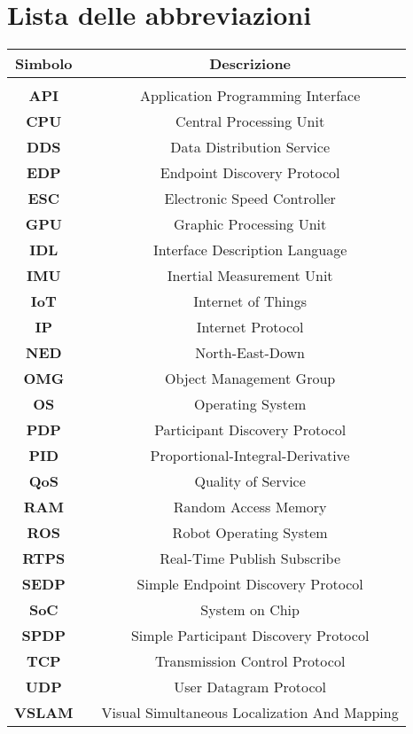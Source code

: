 

\fancyhf{}
\thispagestyle{plain}

\chapter[Lista delle abbreviazioni]{\centering Lista delle abbreviazioni}
\fontsize{14}{14}\selectfont

\begin{center}
\centering
\setlength{\tabcolsep}{15pt}
\fontsize{12}{12}\selectfont
\begin{tabular}{ c c c }
\multicolumn{1}{c}{\Large \textbf{Simbolo}} & & \multicolumn{1}{c}{\Large \textbf{Descrizione}}\\
\hline\hline\\

\textbf{API}   & & Application Programming Interface\\
\textbf{CPU}   & & Central Processing Unit\\
\textbf{DDS}   & & Data Distribution Service\\
\textbf{EDP}   & & Endpoint Discovery Protocol\\
\textbf{ESC}   & & Electronic Speed Controller\\
\textbf{GPU}   & & Graphic Processing Unit\\
\textbf{IDL}   & & Interface Description Language\\
\textbf{IMU}   & & Inertial Measurement Unit\\
\textbf{IoT}   & & Internet of Things\\
\textbf{IP}    & & Internet Protocol\\
\textbf{NED}   & & North-East-Down\\
\textbf{OMG}   & & Object Management Group\\
\textbf{OS}    & & Operating System\\
\textbf{PDP}   & & Participant Discovery Protocol\\
\textbf{PID}   & & Proportional-Integral-Derivative\\
\textbf{QoS}   & & Quality of Service\\
\textbf{RAM}   & & Random Access Memory\\
\textbf{ROS}   & & Robot Operating System\\
\textbf{RTPS}  & & Real-Time Publish Subscribe\\
\textbf{SEDP}  & & Simple Endpoint Discovery Protocol\\
\textbf{SoC}   & & System on Chip\\
\textbf{SPDP}  & & Simple Participant Discovery Protocol\\
\textbf{TCP}   & & Transmission Control Protocol\\
\textbf{UDP}   & & User Datagram Protocol\\
\textbf{VSLAM} & & Visual Simultaneous Localization And Mapping\\


\end{tabular}
\end{center}
